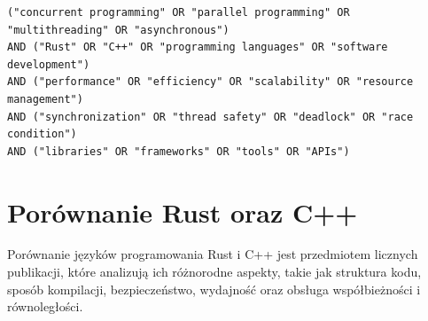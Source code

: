 \lstset{breaklines=true}
\begin{lstlisting}[caption=Kwerenda wygenerowana przez AI, label=AIQuery]
("concurrent programming" OR "parallel programming" OR "multithreading" OR "asynchronous")
AND ("Rust" OR "C++" OR "programming languages" OR "software development")
AND ("performance" OR "efficiency" OR "scalability" OR "resource management")
AND ("synchronization" OR "thread safety" OR "deadlock" OR "race condition")
AND ("libraries" OR "frameworks" OR "tools" OR "APIs")
\end{lstlisting}


\section{Porównanie Rust oraz C++}
Porównanie języków programowania Rust i C++ jest przedmiotem licznych publikacji, które analizują ich różnorodne aspekty, takie jak struktura kodu, sposób kompilacji, bezpieczeństwo, wydajność oraz obsługa współbieżności i równoległości.

